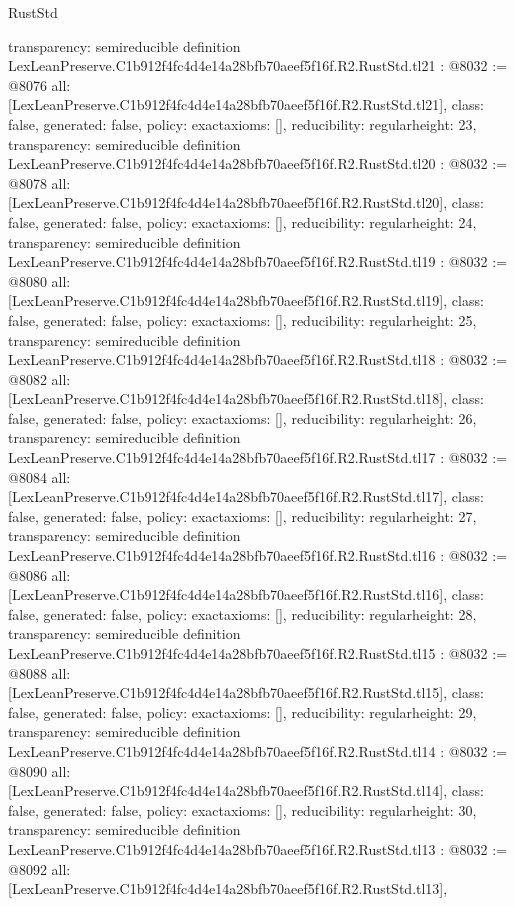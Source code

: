 \begin{lexlean}{RustStd}
\begin{coremodule}
{  transparency: semireducible
}
definition LexLeanPreserve.C1b912f4fc4d4e14a28bfb70aeef5f16f.R2.RustStd.tl21 : @8032 := @8076 {
  all: [LexLeanPreserve.C1b912f4fc4d4e14a28bfb70aeef5f16f.R2.RustStd.tl21],
  class: false,
  generated: false,
  policy: exact{axioms: []},
  reducibility: regular{height: 23},
  transparency: semireducible
}
definition LexLeanPreserve.C1b912f4fc4d4e14a28bfb70aeef5f16f.R2.RustStd.tl20 : @8032 := @8078 {
  all: [LexLeanPreserve.C1b912f4fc4d4e14a28bfb70aeef5f16f.R2.RustStd.tl20],
  class: false,
  generated: false,
  policy: exact{axioms: []},
  reducibility: regular{height: 24},
  transparency: semireducible
}
definition LexLeanPreserve.C1b912f4fc4d4e14a28bfb70aeef5f16f.R2.RustStd.tl19 : @8032 := @8080 {
  all: [LexLeanPreserve.C1b912f4fc4d4e14a28bfb70aeef5f16f.R2.RustStd.tl19],
  class: false,
  generated: false,
  policy: exact{axioms: []},
  reducibility: regular{height: 25},
  transparency: semireducible
}
definition LexLeanPreserve.C1b912f4fc4d4e14a28bfb70aeef5f16f.R2.RustStd.tl18 : @8032 := @8082 {
  all: [LexLeanPreserve.C1b912f4fc4d4e14a28bfb70aeef5f16f.R2.RustStd.tl18],
  class: false,
  generated: false,
  policy: exact{axioms: []},
  reducibility: regular{height: 26},
  transparency: semireducible
}
definition LexLeanPreserve.C1b912f4fc4d4e14a28bfb70aeef5f16f.R2.RustStd.tl17 : @8032 := @8084 {
  all: [LexLeanPreserve.C1b912f4fc4d4e14a28bfb70aeef5f16f.R2.RustStd.tl17],
  class: false,
  generated: false,
  policy: exact{axioms: []},
  reducibility: regular{height: 27},
  transparency: semireducible
}
definition LexLeanPreserve.C1b912f4fc4d4e14a28bfb70aeef5f16f.R2.RustStd.tl16 : @8032 := @8086 {
  all: [LexLeanPreserve.C1b912f4fc4d4e14a28bfb70aeef5f16f.R2.RustStd.tl16],
  class: false,
  generated: false,
  policy: exact{axioms: []},
  reducibility: regular{height: 28},
  transparency: semireducible
}
definition LexLeanPreserve.C1b912f4fc4d4e14a28bfb70aeef5f16f.R2.RustStd.tl15 : @8032 := @8088 {
  all: [LexLeanPreserve.C1b912f4fc4d4e14a28bfb70aeef5f16f.R2.RustStd.tl15],
  class: false,
  generated: false,
  policy: exact{axioms: []},
  reducibility: regular{height: 29},
  transparency: semireducible
}
definition LexLeanPreserve.C1b912f4fc4d4e14a28bfb70aeef5f16f.R2.RustStd.tl14 : @8032 := @8090 {
  all: [LexLeanPreserve.C1b912f4fc4d4e14a28bfb70aeef5f16f.R2.RustStd.tl14],
  class: false,
  generated: false,
  policy: exact{axioms: []},
  reducibility: regular{height: 30},
  transparency: semireducible
}
definition LexLeanPreserve.C1b912f4fc4d4e14a28bfb70aeef5f16f.R2.RustStd.tl13 : @8032 := @8092 {
  all: [LexLeanPreserve.C1b912f4fc4d4e14a28bfb70aeef5f16f.R2.RustStd.tl13],
}
\end{coremodule}
\end{lexlean}
